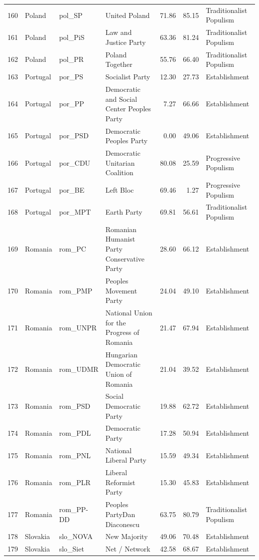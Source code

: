 \begin{landscape}
\begin{longtable}[c]{@{\extracolsep{\fill}}rlllrrl}
  160 & Poland & pol\_SP & United Poland & 71.86 & 85.15 & Traditionalist Populism \\ 
  161 & Poland & pol\_PiS & Law and Justice Party & 63.36 & 81.24 & Traditionalist Populism \\ 
  162 & Poland & pol\_PR & Poland Together & 55.76 & 66.40 & Traditionalist Populism \\ 
  163 & Portugal & por\_PS & Socialist Party & 12.30 & 27.73 & Establishment \\ 
  164 & Portugal & por\_PP & Democratic and Social Center Peoples Party & 7.27 & 66.66 & Establishment \\ 
  165 & Portugal & por\_PSD & Democratic Peoples Party & 0.00 & 49.06 & Establishment \\ 
  166 & Portugal & por\_CDU & Democratic Unitarian Coalition & 80.08 & 25.59 & Progressive Populism \\ 
  167 & Portugal & por\_BE & Left Bloc & 69.46 & 1.27 & Progressive Populism \\ 
  168 & Portugal & por\_MPT & Earth Party & 69.81 & 56.61 & Traditionalist Populism \\ 
  169 & Romania & rom\_PC & Romanian Humanist Party Conservative Party & 28.60 & 66.12 & Establishment \\ 
  170 & Romania & rom\_PMP & Peoples Movement Party & 24.04 & 49.10 & Establishment \\ 
  171 & Romania & rom\_UNPR & National Union for the Progress of Romania & 21.47 & 67.94 & Establishment \\ 
  172 & Romania & rom\_UDMR & Hungarian Democratic Union of Romania & 21.04 & 39.52 & Establishment \\ 
  173 & Romania & rom\_PSD & Social Democratic Party & 19.88 & 62.72 & Establishment \\ 
  174 & Romania & rom\_PDL & Democratic Party & 17.28 & 50.94 & Establishment \\ 
  175 & Romania & rom\_PNL & National Liberal Party & 15.59 & 49.34 & Establishment \\ 
  176 & Romania & rom\_PLR & Liberal Reformist Party & 15.30 & 45.83 & Establishment \\ 
  177 & Romania & rom\_PP-DD & Peoples PartyDan Diaconescu & 63.75 & 80.79 & Traditionalist Populism \\ 
  178 & Slovakia & slo\_NOVA & New Majority & 49.06 & 70.48 & Establishment \\ 
  179 & Slovakia & slo\_Siet & Net / Network & 42.58 & 68.67 & Establishment \\ 

\end{longtable}
\end{landscape}
